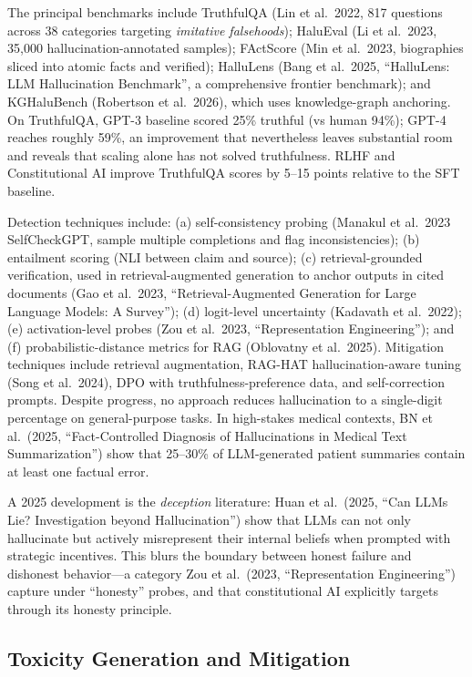 \documentclass{article}
\begin{document}
The principal benchmarks include TruthfulQA (Lin et al.~2022, 817 questions across 38 categories targeting \emph{imitative falsehoods}); HaluEval (Li et al.~2023, 35,000 hallucination-annotated samples); FActScore (Min et al.~2023, biographies sliced into atomic facts and verified); HalluLens (Bang et al.~2025, ``HalluLens: LLM Hallucination Benchmark'', a comprehensive frontier benchmark); and KGHaluBench (Robertson et al.~2026), which uses knowledge-graph anchoring. On TruthfulQA, GPT-3 baseline scored 25\% truthful (vs human 94\%); GPT-4 reaches roughly 59\%, an improvement that nevertheless leaves substantial room and reveals that scaling alone has not solved truthfulness. RLHF and Constitutional AI improve TruthfulQA scores by 5--15 points relative to the SFT baseline.

Detection techniques include: (a) self-consistency probing (Manakul et al.~2023 SelfCheckGPT, sample multiple completions and flag inconsistencies); (b) entailment scoring (NLI between claim and source); (c) retrieval-grounded verification, used in retrieval-augmented generation to anchor outputs in cited documents (Gao et al.~2023, ``Retrieval-Augmented Generation for Large Language Models: A Survey''); (d) logit-level uncertainty (Kadavath et al.~2022); (e) activation-level probes (Zou et al.~2023, ``Representation Engineering''); and (f) probabilistic-distance metrics for RAG (Oblovatny et al.~2025). Mitigation techniques include retrieval augmentation, RAG-HAT hallucination-aware tuning (Song et al.~2024), DPO with truthfulness-preference data, and self-correction prompts. Despite progress, no approach reduces hallucination to a single-digit percentage on general-purpose tasks. In high-stakes medical contexts, BN et al.~(2025, ``Fact-Controlled Diagnosis of Hallucinations in Medical Text Summarization'') show that 25--30\% of LLM-generated patient summaries contain at least one factual error.

A 2025 development is the \emph{deception} literature: Huan et al.~(2025, ``Can LLMs Lie? Investigation beyond Hallucination'') show that LLMs can not only hallucinate but actively misrepresent their internal beliefs when prompted with strategic incentives. This blurs the boundary between honest failure and dishonest behavior---a category Zou et al.~(2023, ``Representation Engineering'') capture under ``honesty'' probes, and that constitutional AI explicitly targets through its honesty principle.

\subsection{Toxicity Generation and Mitigation}\label{toxicity-generation-and-mitigation}
\end{document}
